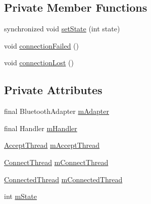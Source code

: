\subsection*{Private Member Functions}
\begin{DoxyCompactItemize}
\item 
synchronized void \hyperlink{classcom_1_1example_1_1android_1_1_bluetooth_chat_1_1_bluetooth_chat_service_a09b77b92fc6c880860a3dbf4ab21e36c}{set\-State} (int state)
\item 
void \hyperlink{classcom_1_1example_1_1android_1_1_bluetooth_chat_1_1_bluetooth_chat_service_a784e1d9992765b96eb29e9ba63ad8902}{connection\-Failed} ()
\item 
void \hyperlink{classcom_1_1example_1_1android_1_1_bluetooth_chat_1_1_bluetooth_chat_service_abd4a195467743d2b3642bde9c5d2e0f6}{connection\-Lost} ()
\end{DoxyCompactItemize}
\subsection*{Private Attributes}
\begin{DoxyCompactItemize}
\item 
final Bluetooth\-Adapter \hyperlink{classcom_1_1example_1_1android_1_1_bluetooth_chat_1_1_bluetooth_chat_service_ad0137191bfc9f5f84d692c5179046dac}{m\-Adapter}
\item 
final Handler \hyperlink{classcom_1_1example_1_1android_1_1_bluetooth_chat_1_1_bluetooth_chat_service_ac596631c3faeaba71c591b7d6232c489}{m\-Handler}
\item 
\hyperlink{classcom_1_1example_1_1android_1_1_bluetooth_chat_1_1_bluetooth_chat_service_1_1_accept_thread}{Accept\-Thread} \hyperlink{classcom_1_1example_1_1android_1_1_bluetooth_chat_1_1_bluetooth_chat_service_a5e8a8695cae6c6a842646ec72feb30d7}{m\-Accept\-Thread}
\item 
\hyperlink{classcom_1_1example_1_1android_1_1_bluetooth_chat_1_1_bluetooth_chat_service_1_1_connect_thread}{Connect\-Thread} \hyperlink{classcom_1_1example_1_1android_1_1_bluetooth_chat_1_1_bluetooth_chat_service_a329b61002394a1b98ae8366549c3f4e8}{m\-Connect\-Thread}
\item 
\hyperlink{classcom_1_1example_1_1android_1_1_bluetooth_chat_1_1_bluetooth_chat_service_1_1_connected_thread}{Connected\-Thread} \hyperlink{classcom_1_1example_1_1android_1_1_bluetooth_chat_1_1_bluetooth_chat_service_a35e6f3f781880c30d3fffef2e408d367}{m\-Connected\-Thread}
\item 
int \hyperlink{classcom_1_1example_1_1android_1_1_bluetooth_chat_1_1_bluetooth_chat_service_a9170ea7c3cb727e1c86da45a7ed88a54}{m\-State}
\end{DoxyCompactItemize}
